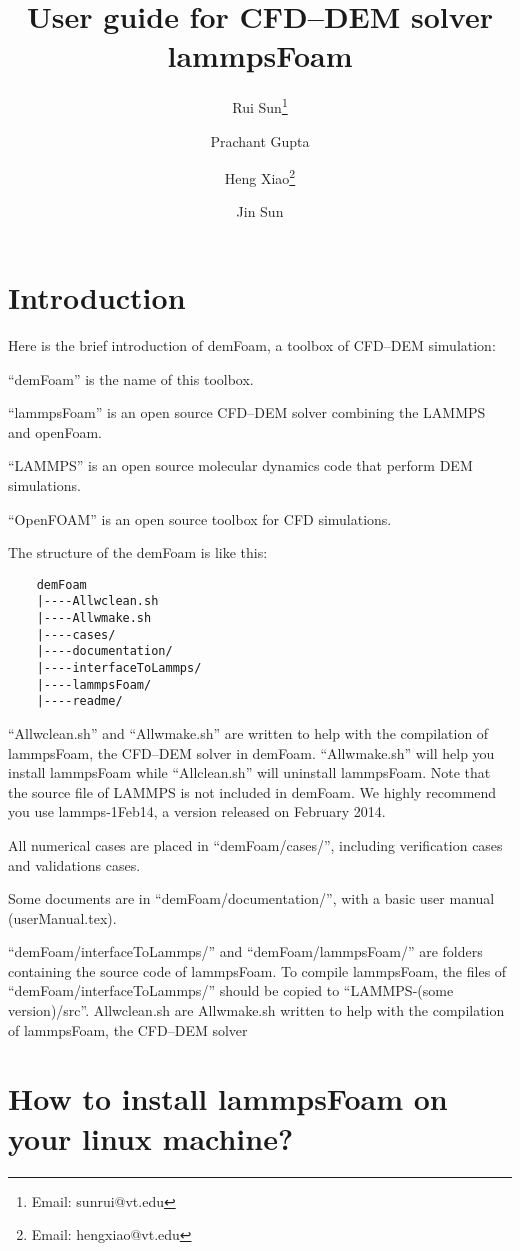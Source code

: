 \documentclass[11pt]{article}
\title{User guide for CFD--DEM solver lammpsFoam}
\author[1]{Rui Sun\thanks{Email: sunrui@vt.edu}}
\author[2]{Prachant Gupta}
\author[1]{Heng Xiao\thanks{Email: hengxiao@vt.edu}}
\author[2]{Jin Sun}
\affil[1]{Department of Aerospace and Ocean Engineering, Virginia Tech, United States}
\affil[2]{Institute for Infrastructure and Environment, The University of Edinburgh, UK}
\date{}
\begin{document}
\maketitle

\section{Introduction}

Here is the brief introduction of demFoam, a toolbox of CFD--DEM simulation:

``demFoam'' is the name of this toolbox. 

``lammpsFoam'' is an open source CFD--DEM solver combining the LAMMPS and openFoam.

``LAMMPS'' is an open source molecular dynamics code that perform DEM simulations.

``OpenFOAM'' is an open source toolbox for CFD simulations.

The structure of the demFoam is like this:

\begin{lstlisting}
    demFoam
    |----Allwclean.sh
    |----Allwmake.sh
    |----cases/
    |----documentation/
    |----interfaceToLammps/
    |----lammpsFoam/
    |----readme/
\end{lstlisting}

``Allwclean.sh'' and ``Allwmake.sh'' are written to help with the compilation of lammpsFoam, the
CFD--DEM solver in demFoam. ``Allwmake.sh'' will help you install lammpsFoam while ``Allclean.sh''
will uninstall lammpsFoam. Note that the source file of LAMMPS is not included in demFoam. We highly
recommend you use lammps-1Feb14, a version released on February 2014.

All numerical cases are placed in ``demFoam/cases/'', including verification cases and validations cases.

Some documents are in ``demFoam/documentation/'', with a basic user manual (userManual.tex).

``demFoam/interfaceToLammps/'' and ``demFoam/lammpsFoam/'' are folders containing the source code of
lammpsFoam. To compile lammpsFoam, the files of ``demFoam/interfaceToLammps/'' should be copied to
``LAMMPS-(some version)/src''.
Allwclean.sh are Allwmake.sh written to help with the compilation of lammpsFoam, the CFD--DEM solver

\section{How to install lammpsFoam on your linux machine?}
\end{document}
